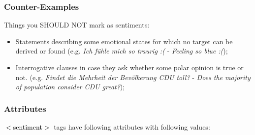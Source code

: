 \documentclass[11pt,a4paper]{article}
\newcommand{\xmltag}[1]{\textcolor{black}{{\small$<$#1$>$}}}
\begin{document}
\subsubsection{Counter-Examples}
Things you SHOULD NOT mark as sentiments:
\begin{itemize}
  \item Statements describing some emotional states for which no
    target can be derived or found (e.g. \textit{Ich f\"uhle mich so
      traurig :(} - \textit{Feeling so blue :(});
  \item Interrogative clauses in case they ask whether some polar
    opinion is true or not. (e.g. \textit{Findet die Mehrheit
      der Bev\"olkerung CDU toll?} - \textit{Does the majority
      of population consider CDU great?});
\end{itemize}


\subsubsection{Attributes}
\xmltag{sentiment} tags have following attributes with following
values:
\end{document}
